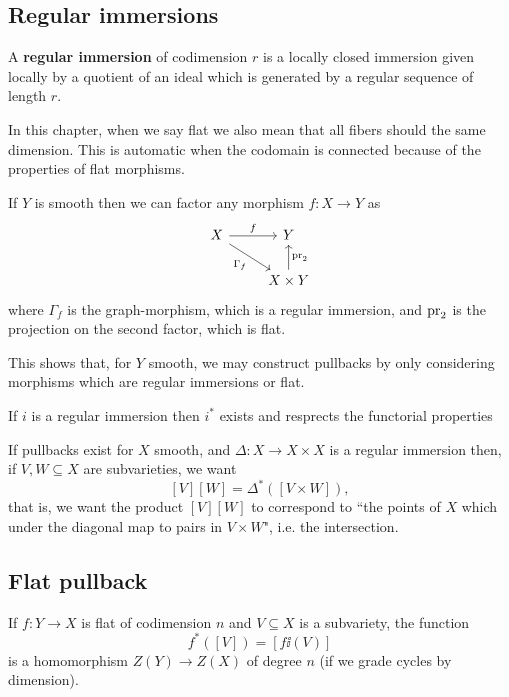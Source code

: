 \subsection{Regular immersions}
\begin{definition}[]
A \textbf{regular immersion} of codimension $r$ is a locally closed immersion given locally by a quotient of an ideal which is generated by a regular sequence of length $r$.
\end{definition}

\begin{notation}
In this chapter, when we say flat we also mean that all fibers should the same dimension. This is automatic when the codomain is connected because of the properties of flat morphisms.
\end{notation}

\begin{fact}[]
If $Y$ is smooth then we can factor any morphism $f:X\to Y$ as
\[\begin{tikzcd}
	X & Y \\
	& {X\times Y}
	\arrow["f", from=1-1, to=1-2]
	\arrow["{\Gamma_f}"', from=1-1, to=2-2]
	\arrow["{\pr_2}"', from=2-2, to=1-2]
\end{tikzcd}\]
where $\Gamma_f$ is the graph-morphism, which is a regular immersion, and $\mathrm{pr}_2$ is the projection on the second factor, which is flat. 
\end{fact}

This shows that, for $Y$ smooth, we may construct pullbacks by only considering morphisms which are regular immersions or flat.

\begin{theorem}[]
If $i$ is a regular immersion then $i^\ast$ exists and resprects the functorial properties 
\end{theorem}

\begin{remark}
If pullbacks exist for $X$ smooth, and $\Delta:X\to X\times X$ is a regular immersion then, if $V,W\subseteq X$ are subvarieties, we want
\[[V][W]=\Delta^\ast([V\times W]),\]
that is, we want the product $[V][W]$ to correspond to ``the points of $X$ which under the diagonal map to pairs in $V\times W$", i.e. the intersection.
\end{remark}

\subsection{Flat pullback}
\begin{theorem}[]
If $f:Y\to X$ is flat of codimension $n$ and $V\subseteq X$ is a subvariety, the function
\[f^\ast([V])=[f\ii(V)]\]
is a homomorphism $Z(Y)\to Z(X)$ of degree $n$ (if we grade cycles by dimension).
\end{theorem}



